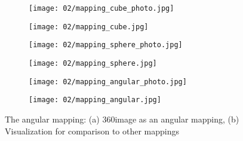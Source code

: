 \begin{figure}
\centering
    \begin{subfigure}[b]{0.5\textwidth}            
            \centering
            \texttt{[image: 02/mapping\_cube\_photo.jpg]}
            \caption{}
    \end{subfigure}%
    \begin{subfigure}[b]{0.5\textwidth}
            \centering
            \texttt{[image: 02/mapping\_cube.jpg]}
            \caption{}
    \end{subfigure}
    \caption[Cube map mapping]{The cube map mapping: (a) 360\degree image as a cube map, (b) Visualization for comparison to other mappings \protect\footnotemark}\label{fig:cubemap-intro}

    \quad
    \begin{subfigure}[b]{0.5\textwidth}            
            \centering
            \texttt{[image: 02/mapping\_sphere\_photo.jpg]}
            \caption{}
    \end{subfigure}%
    \begin{subfigure}[b]{0.5\textwidth}
            \centering
            \texttt{[image: 02/mapping\_sphere.jpg]}
            \caption{}
    \end{subfigure}
    \caption[Mirrored sphere mapping]{The mirrored sphere mapping: (a) 360\degree image as a mirrored sphere mapping, (b) Visualization for comparison to other mappings}\label{fig:sphere-intro}

    \quad
    \begin{subfigure}[b]{0.5\textwidth}            
            \centering
            \texttt{[image: 02/mapping\_angular\_photo.jpg]}
            \caption{}
    \end{subfigure}%
    \begin{subfigure}[b]{0.5\textwidth}
            \centering
            \texttt{[image: 02/mapping\_angular.jpg]}
            \caption{}
    \end{subfigure}
    \caption[Angular mapping]{The angular mapping: (a) 360\degree image as an angular mapping, (b) Visualization for comparison to other mappings}\label{fig:angular-intro}


\end{figure}
